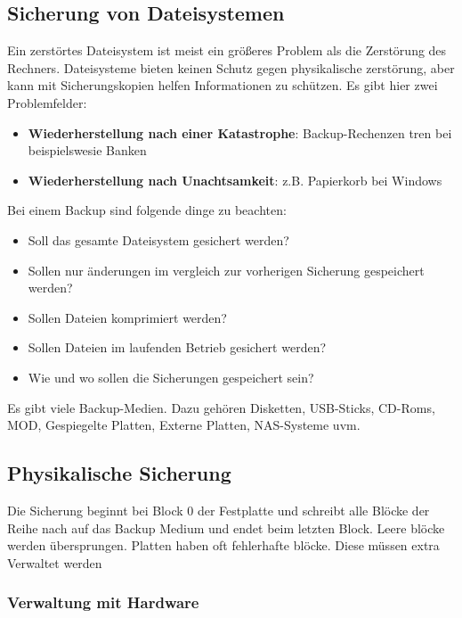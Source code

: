 \subsection{Sicherung von Dateisystemen}

Ein zerstörtes Dateisystem ist meist ein größeres Problem als die Zerstörung
des Rechners. Dateisysteme bieten keinen Schutz gegen physikalische zerstörung,
aber kann mit Sicherungskopien helfen Informationen zu schützen. Es gibt hier
zwei Problemfelder:

\begin{itemize}
    \item \textbf{Wiederherstellung nach einer Katastrophe}: Backup-Rechen\-zen
          \-tren bei beispielswesie Banken
    \item \textbf{Wiederherstellung nach Unachtsamkeit}: z.B. Papierkorb bei Windows
\end{itemize}

Bei einem Backup sind folgende dinge zu beachten:

\begin{itemize}
    \item Soll das gesamte Dateisystem gesichert werden?
    \item Sollen nur änderungen im vergleich zur vorherigen Sicherung gespeichert werden?
    \item Sollen Dateien komprimiert werden?
    \item Sollen Dateien im laufenden Betrieb gesichert werden?
    \item Wie und wo sollen die Sicherungen gespeichert sein?
\end{itemize}

Es gibt viele Backup-Medien. Dazu gehören Disketten, USB-Sticks, CD-Roms, MOD,
Gespiegelte Platten, Externe Platten, NAS-Systeme uvm.

\subsection{Physikalische Sicherung}

Die Sicherung beginnt bei Block 0 der Festplatte und schreibt alle Blöcke der
Reihe nach auf das Backup Medium und endet beim letzten Block. Leere blöcke
werden übersprungen. Platten haben oft fehlerhafte blöcke. Diese müssen extra
Verwaltet werden

\subsubsection{Verwaltung mit Hardware}

